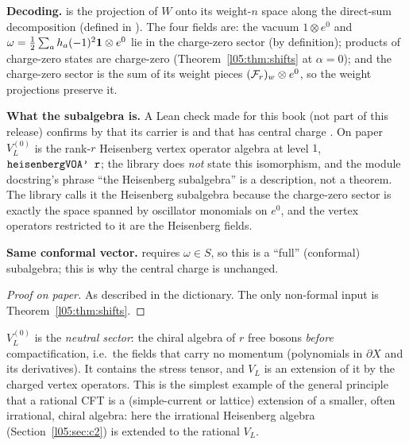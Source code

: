 \begin{dictionary}
\textbf{Decoding.}  is the projection of $W$ onto its weight-$n$ space along the direct-sum
decomposition (defined in ). The four
fields are: the vacuum $1\otimes e^0$ and $\omega=\frac12\sum_ah_a(-1)^2\mathbf{1}\otimes e^0$ lie in the charge-zero sector
(by definition); products of charge-zero states are charge-zero (Theorem~\ref{l05:thm:shifts} at $\alpha=0$); and the
charge-zero sector is the sum of its weight pieces $(\mathcal{F}_r)_w\otimes e^0$, so the weight projections preserve it.

\textbf{What the subalgebra is.} A Lean check made for this book (not part of this release) confirms by
 that its carrier is  and that  has central
charge . On paper $V_L^{(0)}$ is the rank-$r$ Heisenberg vertex operator algebra at level $1$,
$\lean{heisenbergVOA' r}$; the library does \emph{not} state this isomorphism, and the module docstring's phrase ``the
Heisenberg subalgebra'' is a description, not a theorem. The library calls it the Heisenberg subalgebra because the
charge-zero sector is exactly the space spanned by oscillator monomials on $e^0$, and the vertex operators restricted
to it are the Heisenberg fields.

\textbf{Same conformal vector.}  requires $\omega\in S$, so this is a ``full'' (conformal)
subalgebra; this is why the central charge is unchanged.
\end{dictionary}

\begin{proof}[Proof on paper]
As described in the dictionary. The only non-formal input is Theorem~\ref{l05:thm:shifts}.
\end{proof}

\begin{physics}
$V_L^{(0)}$ is the \emph{neutral sector}: the chiral algebra of $r$ free bosons \emph{before} compactification, i.e.\ the
fields that carry no momentum (polynomials in $\partial X$ and its derivatives). It contains the stress tensor, and
$V_L$ is an extension of it by the charged vertex operators. This is the simplest example of the general principle that
a rational CFT is a (simple-current or lattice) extension of a smaller, often irrational, chiral algebra: here the
irrational Heisenberg algebra (Section~\ref{l05:sec:c2}) is extended to the rational $V_L$.
\end{physics}

